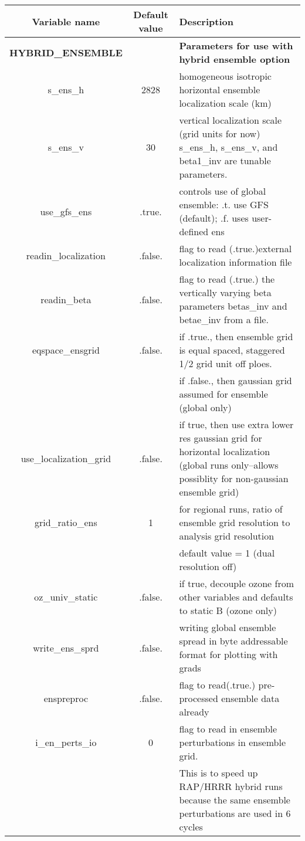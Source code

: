  
 \begin{table}[h]
 \footnotesize
 \center
 \begin{tabular}{| c | c | p{9cm} |}
 \hline
 Variable name & Default value & Description \\
 \hline
 \textbf{HYBRID\_ENSEMBLE} & &  \textbf{Parameters for use with hybrid ensemble option} \\
 \hline
 s\_ens\_h & 2828 & homogeneous isotropic horizontal ensemble localization scale (km) \\
 \hline
 s\_ens\_v & 30 & vertical localization scale (grid units for now) s\_ens\_h, s\_ens\_v, and beta1\_inv are tunable parameters. \\
 \hline
 use\_gfs\_ens & .true.	& controls use of global ensemble: .t. use GFS (default); .f. uses user-defined ens \\
 \hline
 readin\_localization & .false. & flag to read (.true.)external localization information file \\
 \hline
 readin\_beta & .false. & flag to read (.true.) the vertically varying beta parameters betas\_inv and betae\_inv from a file. \\
 \hline
 eqspace\_ensgrid & .false.	& if .true., then ensemble grid is equal spaced, staggered 1/2 grid unit off ploes. \\
              && if .false., then gaussian grid assumed for ensemble (global only) \\
 \hline
 use\_localization\_grid & .false. & if true, then use extra lower res gaussian grid for horizontal localization  (global runs only--allows possiblity for non-gaussian ensemble grid) \\
 \hline
 grid\_ratio\_ens & 1 & for regional runs, ratio of ensemble grid resolution to analysis grid resolution \\
     && default value = 1  (dual resolution off) \\
 \hline
 oz\_univ\_static & .false. & if true, decouple ozone from other variables and defaults to static B (ozone only) \\
 \hline
 write\_ens\_sprd & .false. & writing global ensemble spread in byte addressable format for plotting with grads \\
 \hline
 enspreproc & .false. & flag to read(.true.) pre-processed ensemble data already \\
 \hline
 i\_en\_perts\_io & 0 & flag to read in ensemble perturbations in ensemble grid. \\
      & & This is to speed up RAP/HRRR hybrid runs because the same ensemble perturbations are used in 6 cycles \\

\end{tabular}
\end{table}
